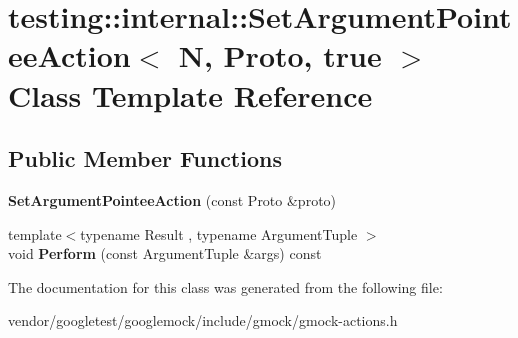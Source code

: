 \hypertarget{classtesting_1_1internal_1_1_set_argument_pointee_action_3_01_n_00_01_proto_00_01true_01_4}{}\section{testing\+:\+:internal\+:\+:Set\+Argument\+Pointee\+Action$<$ N, Proto, true $>$ Class Template Reference}
\label{classtesting_1_1internal_1_1_set_argument_pointee_action_3_01_n_00_01_proto_00_01true_01_4}
\subsection*{Public Member Functions}
\begin{DoxyCompactItemize}
\item 
\mbox{\label{classtesting_1_1internal_1_1_set_argument_pointee_action_3_01_n_00_01_proto_00_01true_01_4_af08b3a61e483f704e93872987d30ade0}} 
{\bfseries Set\+Argument\+Pointee\+Action} (const Proto \&proto)
\item 
\mbox{\label{classtesting_1_1internal_1_1_set_argument_pointee_action_3_01_n_00_01_proto_00_01true_01_4_ac89fa5dde5d2683206a77d29630917cd}} 
{\footnotesize template$<$typename Result , typename Argument\+Tuple $>$ }\\void {\bfseries Perform} (const Argument\+Tuple \&args) const
\end{DoxyCompactItemize}


The documentation for this class was generated from the following file\+:\begin{DoxyCompactItemize}
\item 
vendor/googletest/googlemock/include/gmock/gmock-\/actions.\+h\end{DoxyCompactItemize}
